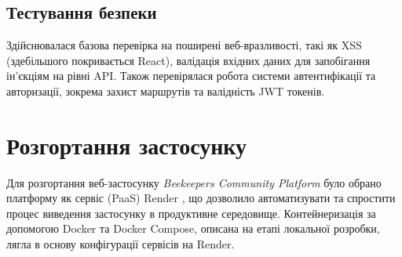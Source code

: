 \subsection{Тестування безпеки}
Здійснювалася базова перевірка на поширені веб-вразливості, такі як XSS (здебільшого покривається React), валідація вхідних даних для запобігання ін'єкціям на рівні API. Також перевірялася робота системи автентифікації та авторизації, зокрема захист маршрутів та валідність JWT токенів.

\section{Розгортання застосунку}
\label{sec:deployment}
Для розгортання веб-застосунку \textit{Beekeepers Community Platform} було обрано платформу як сервіс (PaaS) Render \cite{renderpaas}, що дозволило автоматизувати та спростити процес виведення застосунку в продуктивне середовище. Контейнеризація за допомогою Docker \cite{docker} та Docker Compose, описана на етапі локальної розробки, лягла в основу конфігурації сервісів на Render.

